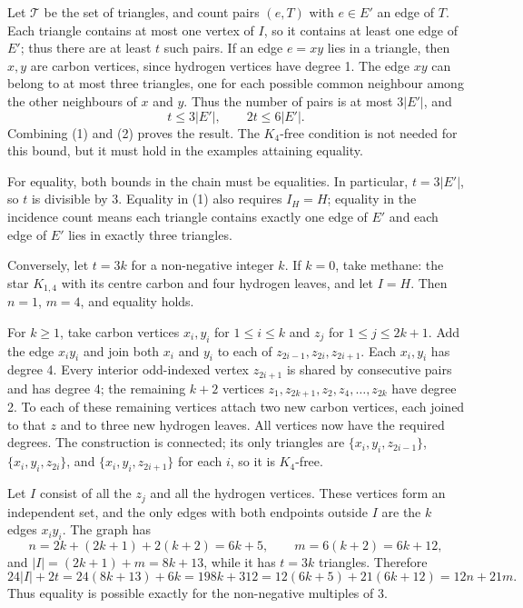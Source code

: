 Let $\mathcal{T}$ be the set of triangles, and count pairs $(e,T)$ with $e\in E'$ an edge of $T$. Each triangle contains at most one vertex of $I$, so it contains at least one edge of $E'$; thus there are at least $t$ such pairs. If an edge $e=xy$ lies in a triangle, then $x,y$ are carbon vertices, since hydrogen vertices have degree 1. The edge $xy$ can belong to at most three triangles, one for each possible common neighbour among the other neighbours of $x$ and $y$. Thus the number of pairs is at most $3|E'|$, and
\[
t\leq 3|E'|,\qquad 2t\leq 6|E'|. \tag{2}
\]
Combining (1) and (2) proves the result. The $K_4$-free condition is not needed for this bound, but it must hold in the examples attaining equality.

For equality, both bounds in the chain must be equalities. In particular, $t=3|E'|$, so $t$ is divisible by 3. Equality in (1) also requires $I_H=H$; equality in the incidence count means each triangle contains exactly one edge of $E'$ and each edge of $E'$ lies in exactly three triangles.

Conversely, let $t=3k$ for a non-negative integer $k$. If $k=0$, take methane: the star $K_{1,4}$ with its centre carbon and four hydrogen leaves, and let $I=H$. Then $n=1$, $m=4$, and equality holds.

For $k\geq1$, take carbon vertices $x_i,y_i$ for $1\leq i\leq k$ and $z_j$ for $1\leq j\leq 2k+1$. Add the edge $x_iy_i$ and join both $x_i$ and $y_i$ to each of $z_{2i-1},z_{2i},z_{2i+1}$. Each $x_i,y_i$ has degree 4. Every interior odd-indexed vertex $z_{2i+1}$ is shared by consecutive pairs and has degree 4; the remaining $k+2$ vertices $z_1,z_{2k+1},z_2,z_4,\ldots,z_{2k}$ have degree 2. To each of these remaining vertices attach two new carbon vertices, each joined to that $z$ and to three new hydrogen leaves. All vertices now have the required degrees. The construction is connected; its only triangles are $\{x_i,y_i,z_{2i-1}\}$, $\{x_i,y_i,z_{2i}\}$, and $\{x_i,y_i,z_{2i+1}\}$ for each $i$, so it is $K_4$-free.

Let $I$ consist of all the $z_j$ and all the hydrogen vertices. These vertices form an independent set, and the only edges with both endpoints outside $I$ are the $k$ edges $x_iy_i$. The graph has
\[
n=2k+(2k+1)+2(k+2)=6k+5,\qquad m=6(k+2)=6k+12,
\]
and $|I|=(2k+1)+m=8k+13$, while it has $t=3k$ triangles. Therefore
\[
24|I|+2t=24(8k+13)+6k=198k+312
=12(6k+5)+21(6k+12)=12n+21m.
\]
Thus equality is possible exactly for the non-negative multiples of 3.

